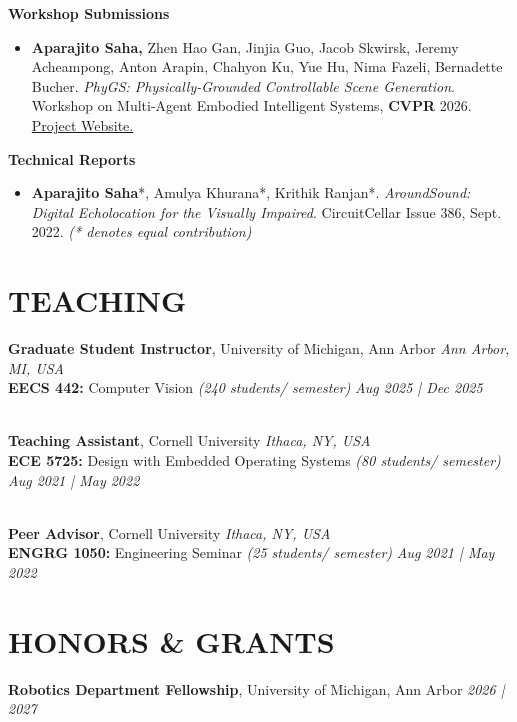 \documentclass[a4paper,9pt]{extarticle}
\begin{document}
\noindent
\textbf{Workshop Submissions}
\begin{itemize}
    \item [\textbf{W1}] \hypertarget{phygs}{} \textbf{Aparajito Saha,} Zhen Hao Gan, Jinjia Guo, Jacob Skwirsk, Jeremy Acheampong, Anton Arapin, Chahyon Ku, Yue Hu, Nima Fazeli, Bernadette Bucher. \textit{PhyGS: Physically-Grounded Controllable Scene Generation}. Workshop on Multi-Agent Embodied Intelligent Systems, \textbf{CVPR} 2026. \href{https://m-and-m-lab.github.io/PhyGS/}{Project Website.}
\end{itemize} 

\noindent
\textbf{Technical Reports}
\begin{itemize}
    \item [\textbf{TR1}] \label{itm:aroundsound} \textbf{Aparajito Saha}*, Amulya Khurana*, Krithik Ranjan*. \textit{AroundSound: Digital Echolocation for the Visually Impaired}. CircuitCellar Issue 386, Sept. 2022. \textit{\small(* denotes equal contribution)}
\end{itemize}

\section*{TEACHING}
\noindent
\textbf{Graduate Student Instructor}, University of Michigan, Ann Arbor \hfill \textit{Ann Arbor, MI, USA}\\ %
\textbf{EECS 442:} Computer Vision \textit{(240 students/ semester)} \hfill \textit{Aug 2025 | Dec 2025} %

\noindent \\
\textbf{Teaching Assistant}, Cornell University \hfill \textit{Ithaca, NY, USA}\\ %
\textbf{ECE 5725:} Design with Embedded Operating Systems \textit{(80 students/ semester)} \hfill \textit{Aug 2021 | May 2022} %

\noindent \\
\textbf{Peer Advisor}, Cornell University \hfill \textit{Ithaca, NY, USA}\\ %
\textbf{ENGRG 1050:} Engineering Seminar \textit{(25 students/ semester)} \hfill \textit{Aug 2021 | May 2022} %

\section*{HONORS \& GRANTS}
\noindent
\textbf{Robotics Department Fellowship}, University of Michigan, Ann Arbor \hfill \textit{2026 | 2027} %
\end{document}
